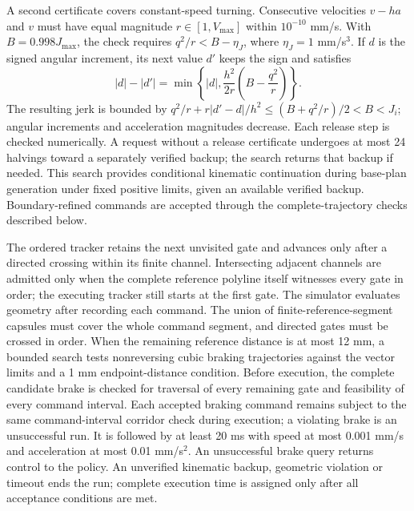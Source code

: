 \documentclass[pdflatex,sn-apa]{sn-jnl}
\begin{document}
A second certificate covers constant-speed turning. Consecutive velocities $v-ha$ and $v$ must have equal magnitude $r\in[1,V_{\max}]$ within $10^{-10}$ mm/s. With $B=0.998J_{\max}$, the check requires $q^2/r<B-\eta_J$, where $\eta_J=1$ mm/s$^3$. If $d$ is the signed angular increment, its next value $d'$ keeps the sign and satisfies
\begin{equation}
|d|-|d'|=\min\!\left\{|d|,\frac{h^2}{2r}\left(B-\frac{q^2}{r}\right)\right\}.
\label{eq:turn_release_main}
\end{equation}
The resulting jerk is bounded by $q^2/r+r|d'-d|/h^2\le(B+q^2/r)/2<B<J_i$; angular increments and acceleration magnitudes decrease. Each release step is checked numerically. A request without a release certificate undergoes at most 24 halvings toward a separately verified backup; the search returns that backup if needed. This search provides conditional kinematic continuation during base-plan generation under fixed positive limits, given an available verified backup. Boundary-refined commands are accepted through the complete-trajectory checks described below.

The ordered tracker retains the next unvisited gate and advances only after a directed crossing within its finite channel. Intersecting adjacent channels are admitted only when the complete reference polyline itself witnesses every gate in order; the executing tracker still starts at the first gate. The simulator evaluates geometry after recording each command. The union of finite-reference-segment capsules must cover the whole command segment, and directed gates must be crossed in order. When the remaining reference distance is at most 12 mm, a bounded search tests nonreversing cubic braking trajectories against the vector limits and a 1 mm endpoint-distance condition. Before execution, the complete candidate brake is checked for traversal of every remaining gate and feasibility of every command interval. Each accepted braking command remains subject to the same command-interval corridor check during execution; a violating brake is an unsuccessful run. It is followed by at least 20 ms with speed at most 0.001 mm/s and acceleration at most 0.01 mm/s$^2$. An unsuccessful brake query returns control to the policy. An unverified kinematic backup, geometric violation or timeout ends the run; complete execution time is assigned only after all acceptance conditions are met.


\end{document}
